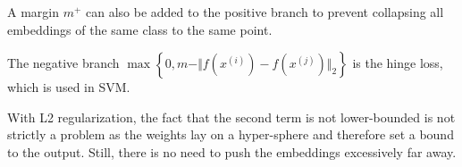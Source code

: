 \begin{description}
            \begin{remark}
                A margin $m^+$ can also be added to the positive branch to prevent collapsing all embeddings of the same class to the same point.
            \end{remark}

            \begin{remark}
                The negative branch $\max\left\{0, m - \Vert f(x^{(i)}) - f(x^{(j)}) \Vert_2\right\}$ is the hinge loss, which is used in SVM.
            \end{remark}

            \begin{remark}
                With L2 regularization, the fact that the second term is not lower-bounded is not strictly a problem as the weights lay on a hyper-sphere and therefore set a bound to the output. Still, there is no need to push the embeddings excessively far away.
            \end{remark}
\end{description}